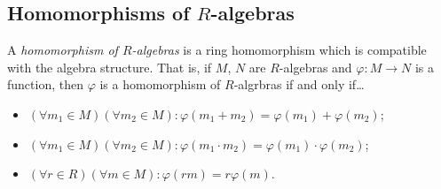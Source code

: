\subsection{Homomorphisms of $R$-algebras}\label{homomorphismofralgebras}
A \emph{homomorphism of $R$-algebras} is a ring homomorphism which is compatible with the algebra
structure. That is, if $M$, $N$ are $R$-algebras and $\varphi : M \rightarrow N$ is a function, then $\varphi$
is a homomorphism of $R$-algrbras if and only if\dots
\begin{itemize}
  \item $(\forall m_1 \in M)(\forall m_2 \in M) : \varphi(m_1 + m_2) = \varphi(m_1) + \varphi(m_2)$;
  \item $(\forall m_1 \in M)(\forall m_2 \in M) : \varphi(m_1 \cdot m_2) = \varphi(m_1) \cdot \varphi(m_2)$;
  \item $(\forall r \in R)(\forall m \in M) : \varphi(rm) = r\varphi(m).$
\end{itemize}